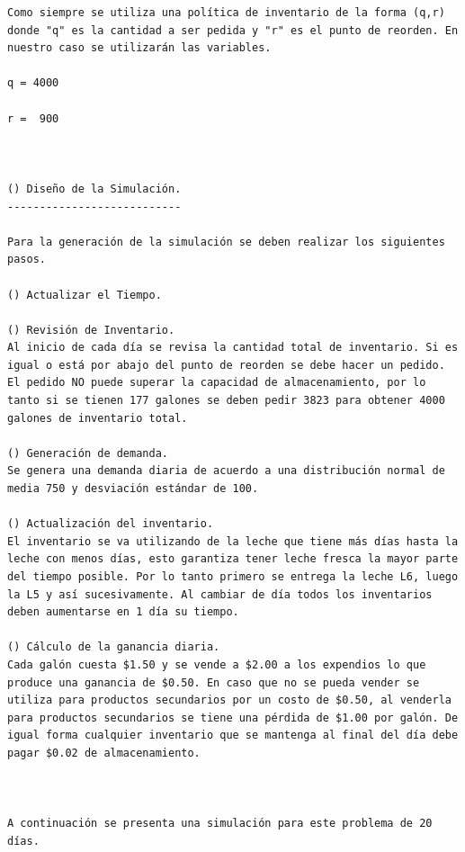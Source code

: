 \begin{verbatim}
Como siempre se utiliza una política de inventario de la forma (q,r) donde "q" es la cantidad a ser pedida y "r" es el punto de reorden. En nuestro caso se utilizarán las variables.

q = 4000

r =  900



() Diseño de la Simulación.
---------------------------

Para la generación de la simulación se deben realizar los siguientes pasos.

() Actualizar el Tiempo.

() Revisión de Inventario.
Al inicio de cada día se revisa la cantidad total de inventario. Si es igual o está por abajo del punto de reorden se debe hacer un pedido. El pedido NO puede superar la capacidad de almacenamiento, por lo tanto si se tienen 177 galones se deben pedir 3823 para obtener 4000 galones de inventario total.

() Generación de demanda.
Se genera una demanda diaria de acuerdo a una distribución normal de media 750 y desviación estándar de 100. 

() Actualización del inventario.
El inventario se va utilizando de la leche que tiene más días hasta la leche con menos días, esto garantiza tener leche fresca la mayor parte del tiempo posible. Por lo tanto primero se entrega la leche L6, luego la L5 y así sucesivamente. Al cambiar de día todos los inventarios deben aumentarse en 1 día su tiempo.

() Cálculo de la ganancia diaria.
Cada galón cuesta $1.50 y se vende a $2.00 a los expendios lo que produce una ganancia de $0.50. En caso que no se pueda vender se utiliza para productos secundarios por un costo de $0.50, al venderla para productos secundarios se tiene una pérdida de $1.00 por galón. De igual forma cualquier inventario que se mantenga al final del día debe pagar $0.02 de almacenamiento.



A continuación se presenta una simulación para este problema de 20 días.


\end{verbatim}

